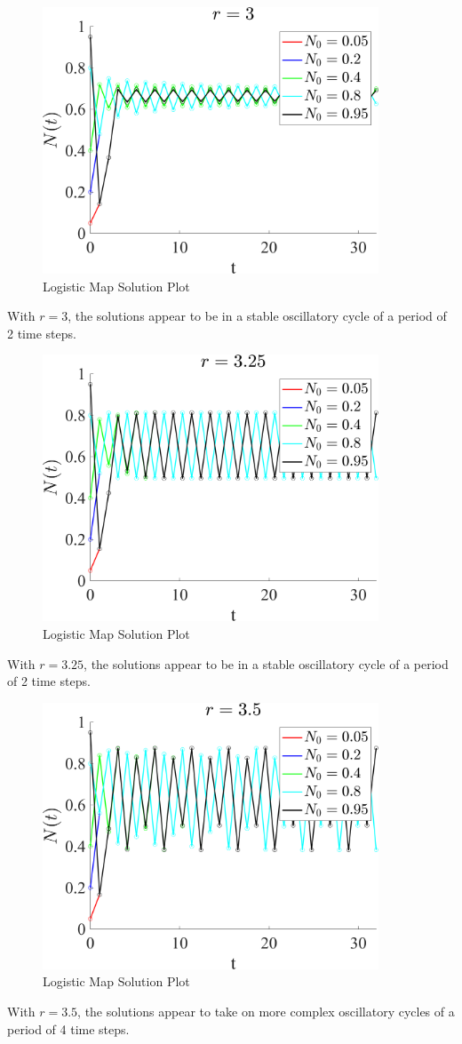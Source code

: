\documentclass[11pt]{article}
\begin{document}
\begin{figure}[H]
\centering
\includegraphics[width=10cm]{Logistic_map_r_3}
\caption{Logistic Map Solution Plot}
\end{figure}
With $r = 3$, the solutions appear to be in a stable oscillatory cycle of a period of 2 time steps.

\begin{figure}[H]
\centering
\includegraphics[width=10cm]{Logistic_map_r_3_25}
\caption{Logistic Map Solution Plot}
\end{figure}
With $r = 3.25$, the solutions appear to be in a stable oscillatory cycle of a period of 2 time steps.

\begin{figure}[H]
\centering
\includegraphics[width=10cm]{Logistic_map_r_3_5}
\caption{Logistic Map Solution Plot}
\end{figure}
With $r = 3.5$, the solutions appear to take on more complex oscillatory cycles of a period of 4 time steps.
\end{document}
